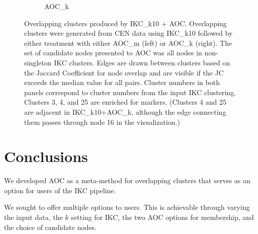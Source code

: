 \documentclass[12pt, oneside]{article}   	%
\begin{document}
\begin{figure}[H]
\begin{subfigure}[t]{0.48\textwidth}
\caption{AOC\_k}
\end{subfigure}
\caption{Overlapping clusters produced by IKC\_k10 + AOC.  Overlapping clusters were generated from CEN data using IKC\_k10 followed by either treatment with either AOC\_m (left) or AOC\_k (right). The set of candidate nodes presented to AOC was all nodes in non-singleton IKC clusters. Edges are drawn between clusters based on the Jaccard Coefficient for node overlap and are visible if the JC exceeds the median value for all pairs. Cluster numbers in both panels correspond to cluster numbers from the input IKC clustering. Clusters 3, 4, and 25 are enriched for markers.  (Clusters 4 and 25 are adjacent in IKC\_k10+AOC\_k, although the edge connecting them passes through node 16 in the visualization.)}
\label{fig:overlapping}
\end{figure}
		
\clearpage
	
\section{Conclusions} We developed AOC as a meta-method for overlapping clusters that serves as an option for users of the IKC pipeline. 

We sought to offer multiple options to users. This is achievable through varying the input data, the $k$ setting for IKC, the two AOC  options for membership, and the choice of candidate nodes.  

\end{document}
